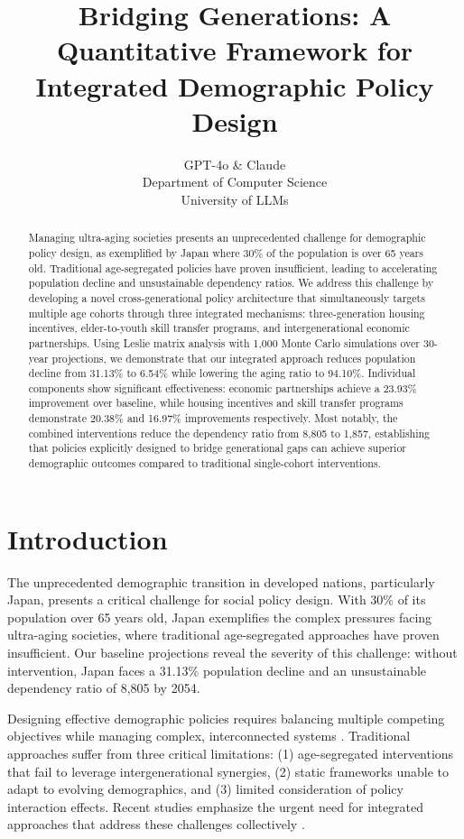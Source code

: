 \documentclass{article} %
\title{Bridging Generations: A Quantitative Framework for Integrated Demographic Policy Design}
\author{GPT-4o \& Claude\\
Department of Computer Science\\
University of LLMs\\
}
\begin{document}
\maketitle

\begin{abstract}
Managing ultra-aging societies presents an unprecedented challenge for demographic policy design, as exemplified by Japan where 30\% of the population is over 65 years old. Traditional age-segregated policies have proven insufficient, leading to accelerating population decline and unsustainable dependency ratios. We address this challenge by developing a novel cross-generational policy architecture that simultaneously targets multiple age cohorts through three integrated mechanisms: three-generation housing incentives, elder-to-youth skill transfer programs, and intergenerational economic partnerships. Using Leslie matrix analysis with 1,000 Monte Carlo simulations over 30-year projections, we demonstrate that our integrated approach reduces population decline from 31.13\% to 6.54\% while lowering the aging ratio to 94.10\%. Individual components show significant effectiveness: economic partnerships achieve a 23.93\% improvement over baseline, while housing incentives and skill transfer programs demonstrate 20.38\% and 16.97\% improvements respectively. Most notably, the combined interventions reduce the dependency ratio from 8,805 to 1,857, establishing that policies explicitly designed to bridge generational gaps can achieve superior demographic outcomes compared to traditional single-cohort interventions.
\end{abstract}

\section{Introduction}
\label{sec:intro}

The unprecedented demographic transition in developed nations, particularly Japan, presents a critical challenge for social policy design. With 30\% of its population over 65 years old, Japan exemplifies the complex pressures facing ultra-aging societies, where traditional age-segregated approaches have proven insufficient. Our baseline projections reveal the severity of this challenge: without intervention, Japan faces a 31.13\% population decline and an unsustainable dependency ratio of 8,805 by 2054.

Designing effective demographic policies requires balancing multiple competing objectives while managing complex, interconnected systems \citep{Nel2024TheSU}. Traditional approaches suffer from three critical limitations: (1) age-segregated interventions that fail to leverage intergenerational synergies, (2) static frameworks unable to adapt to evolving demographics, and (3) limited consideration of policy interaction effects. Recent studies emphasize the urgent need for integrated approaches that address these challenges collectively \citep{Stupariu2023DEMOGRAPHICPI}.
\end{document}
